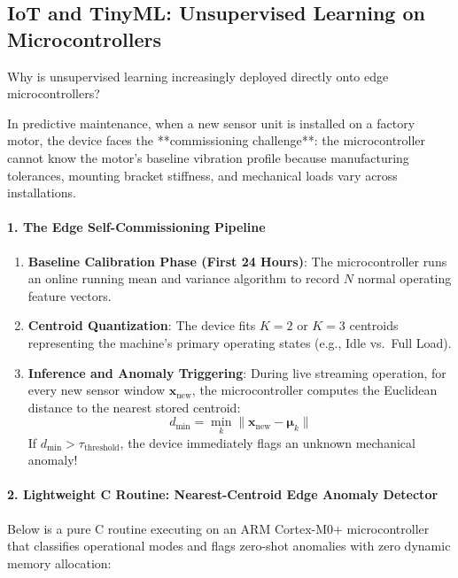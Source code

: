 \subsection{IoT and TinyML: Unsupervised Learning on Microcontrollers}\label{subsec:unsupervised_iot}

\begin{iotbox}
Why is unsupervised learning increasingly deployed directly onto edge microcontrollers?

In predictive maintenance, when a new sensor unit is installed on a factory motor, the device faces the **commissioning challenge**: the microcontroller cannot know the motor's baseline vibration profile because manufacturing tolerances, mounting bracket stiffness, and mechanical loads vary across installations.

\paragraph{1. The Edge Self-Commissioning Pipeline}
\begin{enumerate}
    \item \textbf{Baseline Calibration Phase (First 24 Hours)}: The microcontroller runs an online running mean and variance algorithm to record $N$ normal operating feature vectors.
    \item \textbf{Centroid Quantization}: The device fits $K = 2$ or $K = 3$ centroids representing the machine's primary operating states (e.g., Idle vs.\ Full Load).
    \item \textbf{Inference and Anomaly Triggering}: During live streaming operation, for every new sensor window $\mathbf{x}_{\text{new}}$, the microcontroller computes the Euclidean distance to the nearest stored centroid:
    \begin{equation}
    d_{\min} = \min_{k} \|\mathbf{x}_{\text{new}} - \boldsymbol{\mu}_k\|
    \end{equation}
    If $d_{\min} > \tau_{\text{threshold}}$, the device immediately flags an unknown mechanical anomaly!
\end{enumerate}

\paragraph{2. Lightweight C Routine: Nearest-Centroid Edge Anomaly Detector}
Below is a pure C routine executing on an ARM Cortex-M0+ microcontroller that classifies operational modes and flags zero-shot anomalies with zero dynamic memory allocation:


\end{iotbox}
